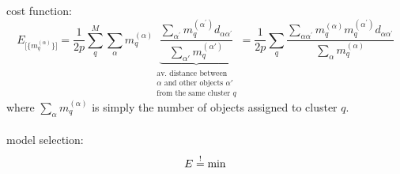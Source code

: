 cost function:
\begin{equation}
	E_{ \big[ \big\{ m_q^{(\alpha)} \big\} \big] }
	= \frac{1}{2p} \sum\limits_q^M \sum\limits_{\alpha}
	m_q^{(\alpha)} \underbrace{ \frac{\sum\limits_{\alpha^{'}} 
		m_q^{(\alpha^{'})} d_{\alpha \alpha^{'}}}{
                \sum\limits_{\alpha'} m_q^{(\alpha')}
		}}_{ \substack{	\text{av. distance between} \\
				\alpha \text{ and other objects $\alpha'$} \\
				\text{from the same cluster } q}}
	= \frac{1}{2p} \sum\limits_q 
	 \frac{\sum\limits_{\alpha \alpha^{'}} m_q^{(\alpha)}
		m_q^{(\alpha^{'})} d_{\alpha \alpha^{'}}}{
			\sum\limits_{\alpha} m_q^{(\alpha)} }
\end{equation}
where $\sum\limits_{\alpha} m_q^{(\alpha)}$ is simply the number of objects assigned to cluster $q$.\\\\ 
model selection:
\begin{equation}
	E \stackrel{\mathrm{!}}{=} \min
\end{equation}


